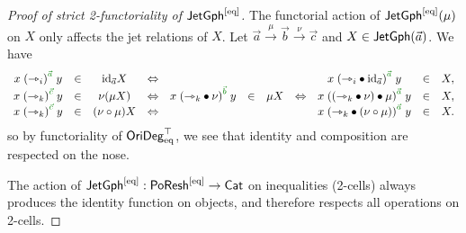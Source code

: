 \documentclass[a4paper]{memoir}
\begin{document}
\begin{proof}[Proof of strict 2-functoriality of $\mathsf{JetGph} ^{[{\mathrm{eq}}]}$]
	The functorial action of $\mathsf{JetGph}^{[{\mathrm{eq}}]}(\mu)$ on $X$ only affects the jet relations of $X$.
	Let $\vec a \xrightarrow{\mu} \vec b \xrightarrow{\nu} \vec c$ and $X \in \mathsf{JetGph}(\vec a)$.
	We have
	\[
		\begin{array}{ccc c ccc c ccc}
			x \mathrel{(\jetsym_i)}\pmr{\vec a} y &\in& \id_{\vec a} X
			&\Leftrightarrow&&&&&
			x \mathrel{(\jetsym_i \oriof \id_{\vec a})}\pmr{\vec a} y &\in& X,
			\\
			x \mathrel{(\jetsym_k)}\pmr{\vec c} y &\in& \nu(\mu X)
			&\Leftrightarrow&
			x \mathrel{(\jetsym_k \oriof \nu)}\pmr{\vec b} y &\in& \mu X
			&\Leftrightarrow&
			x \mathrel{((\jetsym_k \oriof \nu) \oriof \mu)}\pmr{\vec a} y &\in& X,
			\\
			x \mathrel{(\jetsym_k)}\pmr{\vec c} y &\in& (\nu \circ \mu) X
			&\Leftrightarrow&&&&&
			x \mathrel{(\jetsym_k \oriof (\nu \circ \mu))}\pmr{\vec a} y &\in& X.
		\end{array}
	\]
	so by functoriality of $\mathsf{OriDeg}_{\mathrm{eq}}^\top$, we see that identity and composition are respected on the nose.
	
	The action of $\mathsf{JetGph} ^{[{\mathrm{eq}}]} : \mathsf{PoResh} ^{[{\mathrm{eq}}]} \to {\mathsf{Cat}}$ on inequalities (2-cells) always produces the identity function on objects, and therefore respects all operations on 2-cells.
\end{proof}
%	
\end{document}
